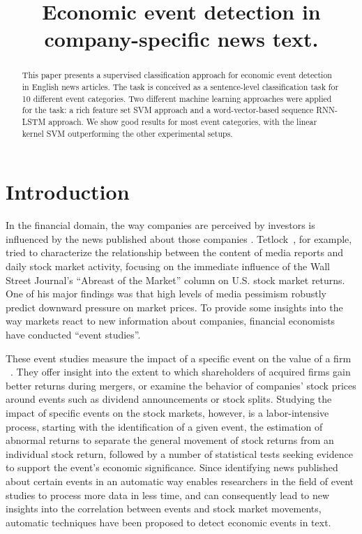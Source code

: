 \documentclass[11pt,a4paper]{article}
\title{Economic event detection in company-specific news text.}
\date{}
\begin{document}
\maketitle

\begin{abstract}
This paper presents a supervised classification approach for economic event detection in English news articles.
The task is conceived as a sentence-level classification task for 10 different event categories.
Two different machine learning approaches were applied for the task: a rich feature set SVM approach and a word-vector-based sequence RNN-LSTM approach.
We show good results for most event categories, with the linear kernel SVM outperforming the other experimental setups.
\end{abstract}

\section{Introduction}

In the financial domain, the way companies are perceived by investors is influenced by the news published about those companies \cite{Engle1993, Tetlock2007, Mian2012}.
Tetlock~, for example, tried to characterize the relationship between the content of media reports and daily  stock market activity, focusing on the immediate influence of the Wall Street Journal’s “Abreast of the Market” column on U.S. stock market returns.
One of his major findings was that high levels of media pessimism robustly predict downward pressure on market prices.
To provide some insights into the way markets react to new information about companies, financial economists have conducted “event studies”.

These event studies measure the impact of a specific event on the value of a firm ~\cite{MacKinlay1997}. They
offer insight into the extent to which shareholders of acquired firms gain better returns during mergers, or examine the behavior of companies’ stock prices around events such as dividend announcements or stock splits. 
Studying the impact of specific events on the stock markets, however, is a labor-intensive process, starting with the identification of a given event, the estimation of abnormal returns to separate the general movement of stock returns from an individual stock return, followed by a number of statistical tests seeking evidence to support the event's economic significance.
Since identifying news published about certain events in an automatic way enables researchers in the field of event studies to process more data in less time, and can consequently lead to new insights into the correlation between events and stock market movements, automatic techniques have been proposed to detect economic events in text.
\end{document}
